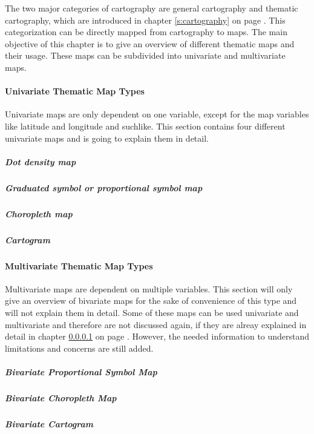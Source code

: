 The two major categories of cartography are general cartography and thematic cartography, which are introduced in chapter \ref{s:cartography} on page \pageref{s:cartography}. This categorization can be directly mapped from cartography to maps. The main objective of this chapter is to give an overview of different thematic maps and their usage. These maps can be subdivided into univariate and multivariate maps.

\paragraph{Univariate Thematic Map Types}
\label{s:univariate-maps}

Univariate maps are only dependent on one variable, except for the map variables like latitude and longitude and suchlike. This section contains four different univariate maps and is going to explain them in detail.

\subparagraph{Dot density map}


\subparagraph{Graduated symbol or proportional symbol map}


\subparagraph{Choropleth map}

\label{s:choropleth}

\subparagraph{Cartogram}


\paragraph{Multivariate Thematic Map Types}
Multivariate maps are dependent on multiple variables. This section will only give an overview of bivariate maps for the sake of convenience of this type and will not explain them in detail. Some of these maps can be used univariate and multivariate and therefore are not discussed again, if they are alreay explained in detail in chapter \ref{s:univariate-maps} on page \pageref{s:univariate-maps}. However, the needed information to understand limitations and concerns are still added.

\subparagraph{Bivariate Proportional Symbol Map}


\subparagraph{Bivariate Choropleth Map}


\subparagraph{Bivariate Cartogram}
